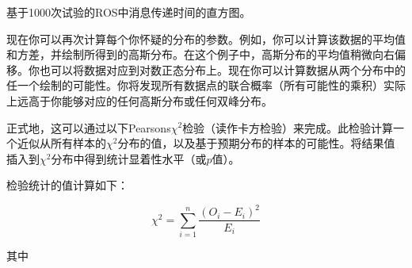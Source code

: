 \begin{framed}

基于1000次试验的ROS中消息传递时间的直方图。
\end{framed}


现在你可以再次计算每个你怀疑的分布的参数。例如，你可以计算该数据的平均值和方差，并绘制所得到的高斯分布。在这个例子中，高斯分布的平均值稍微向右偏移。你也可以将数据对应到对数正态分布上。现在你可以计算数据从两个分布中的任一个绘制的可能性。你将发现所有数据点的联合概率（所有可能性的乘积）实际上远高于你能够对应的任何高斯分布或任何双峰分布。



正式地，这可以通过以下Pearsons$\chi^2$检验（读作卡方检验）来完成。此检验计算一个近似从所有样本的$\chi^2$分布的值，以及基于预期分布的样本的可能性。将结果值插入到$\chi^2$分布中得到统计显着性水平（或$p$值）。

检验统计的值计算如下：

\begin{equation}
\chi^2 = \sum_{i=1}^{n} \frac{(O_i - E_i)^2}{E_i}
\end{equation}

其中

